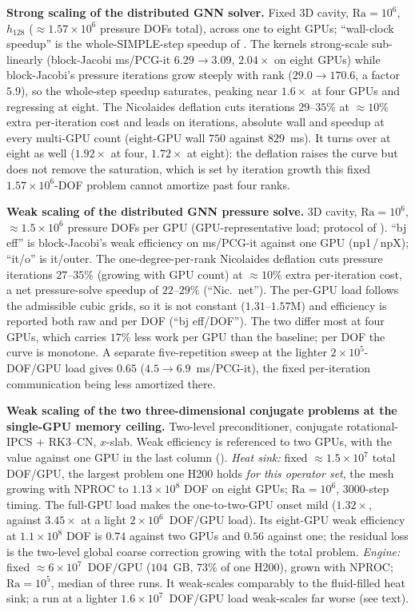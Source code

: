 \label{tab:strongscale}
\caption{\textbf{Strong scaling of the distributed GNN solver.}
Fixed 3D cavity, $\mathrm{Ra}=10^{6}$, $h_{128}$ ($\approx\!1.57\times10^{6}$ pressure DOFs
total), across one to eight GPUs; ``wall-clock speedup'' is the whole-SIMPLE-step speedup of
. The kernels strong-scale sub-linearly (block-Jacobi ms/PCG-it
$6.29\to3.09$, $2.04\times$ on eight GPUs) while block-Jacobi's pressure iterations grow
steeply with rank ($29.0\to170.6$, a factor $5.9$), so the whole-step speedup saturates,
peaking near $1.6\times$ at four GPUs and regressing at eight. The Nicolaides deflation cuts
iterations $29$--$35\%$ at $\approx\!10\%$ extra per-iteration cost and leads on iterations,
absolute wall and speedup at every multi-GPU count (eight-GPU wall $750$ against $829$~ms). It
turns over at eight as well ($1.92\times$ at four, $1.72\times$ at eight): the deflation
raises the curve but does not remove the saturation, which is set by iteration growth this
fixed $1.57\times10^{6}$-DOF problem cannot amortize past four ranks.}

\label{tab:weakscale}
\caption{\textbf{Weak scaling of the distributed GNN pressure solve.}
3D cavity, $\mathrm{Ra}=10^{6}$, $\approx\!1.5\times10^{6}$ pressure DOFs per GPU
(GPU-representative load; protocol of ). ``bj eff'' is
block-Jacobi's weak efficiency on ms/PCG-it against one GPU (np1\,/\,npX); ``it/o'' is
it/outer. The one-degree-per-rank
Nicolaides deflation cuts pressure iterations $27$--$35\%$ (growing with GPU count) at
$\approx\!10\%$ extra per-iteration cost, a net pressure-solve speedup of $22$--$29\%$
(``Nic.\ net''). The per-GPU load follows the admissible cubic grids, so it is not constant
($1.31$--$1.57$M) and efficiency is reported both raw and per DOF (``bj eff/DOF''). The two
differ most at four GPUs, which carries $17\%$ less work per GPU than the baseline; per DOF
the curve is monotone. A separate
five-repetition sweep at the lighter $2\times10^{5}$-DOF/GPU load gives $0.65$
($4.5\!\to\!6.9$~ms/PCG-it), the fixed per-iteration communication being less amortized
there.}

\label{tab:weak-ceiling}
\caption{\textbf{Weak scaling of the two three-dimensional conjugate problems at the
single-GPU memory ceiling.} Two-level preconditioner, conjugate rotational-IPCS + RK3--CN,
$x$-slab. Weak efficiency is referenced to two GPUs, with the value against one GPU in the
last column ().
\emph{Heat sink:} fixed $\approx\!1.5\times10^{7}$ total DOF/GPU, the largest problem one H200
holds \emph{for this operator set}, the mesh growing with NPROC to $1.13\times10^{8}$ DOF on
eight GPUs; $\mathrm{Ra}=10^{6}$, 3000-step timing. The full-GPU load makes the one-to-two-GPU onset
mild ($1.32\times$, against $3.45\times$ at a light $2\times10^{6}$~DOF/GPU load). Its
eight-GPU weak efficiency at $1.1\times10^{8}$ DOF is $0.74$ against two GPUs and $0.56$
against one; the residual loss is the two-level global coarse correction growing with the
total problem.
\emph{Engine:} fixed $\approx\!6\times10^{7}$~DOF/GPU ($104$~GB, $73\%$ of one H200), grown
with NPROC; $\mathrm{Ra}=10^{5}$, median of three runs. It weak-scales comparably to the
fluid-filled heat sink; a run at a lighter $1.6\times10^{7}$~DOF/GPU load weak-scales far
worse (see text).}
